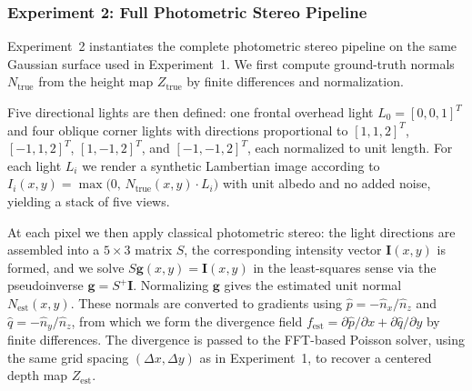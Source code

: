 \documentclass[11pt]{article}
\begin{document}
\subsubsection{Experiment 2: Full Photometric Stereo Pipeline}

\begin{center}
%
\end{center}

Experiment~2 instantiates the complete photometric stereo pipeline on the same Gaussian surface used in Experiment~1. We first compute ground-truth normals $N_{\text{true}}$ from the height map $Z_{\text{true}}$ by finite differences and normalization. 

Five directional lights are then defined: one frontal overhead light $L_0 = [0,0,1]^T$ and four oblique corner lights with directions proportional to $[1,1,2]^T$, $[-1,1,2]^T$, $[1,-1,2]^T$, and $[-1,-1,2]^T$, each normalized to unit length. For each light $L_i$ we render a synthetic Lambertian image according to $I_i(x,y) = \max\bigl(0,\, N_{\text{true}}(x,y)\cdot L_i\bigr)$ with unit albedo and no added noise, yielding a stack of five views.

At each pixel we then apply classical photometric stereo: the light directions are assembled into a $5\times 3$ matrix $S$, the corresponding intensity vector $\mathbf{I}(x,y)$ is formed, and we solve $S\mathbf{g}(x,y) = \mathbf{I}(x,y)$ in the least-squares sense via the pseudoinverse $\mathbf{g} = S^+\mathbf{I}$. Normalizing $\mathbf{g}$ gives the estimated unit normal $N_{\text{est}}(x,y)$. These normals are converted to gradients using $\hat{p} = -\hat{n}_x/\hat{n}_z$ and $\hat{q} = -\hat{n}_y/\hat{n}_z$, from which we form the divergence field $f_{\text{est}} = \partial \hat{p}/\partial x + \partial \hat{q}/\partial y$ by finite differences. The divergence is passed to the FFT-based Poisson solver, using the same grid spacing $(\Delta x,\Delta y)$ as in Experiment~1, to recover a centered depth map $Z_{\text{est}}$.
\end{document}
